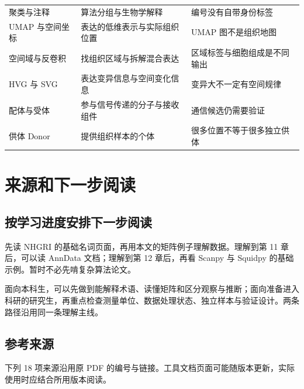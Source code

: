 \documentclass[UTF8,a4paper,11pt,fontset=fandol]{ctexart}
\newcommand{\chapterstart}[1]{\clearpage\section{#1}}
\begin{document}
{\begin{longtable}{@{}p{3.35cm} p{5.05cm} p{\dimexpr\linewidth-8.4cm-4\tabcolsep\relax}@{}}
聚类与注释 & 算法分组与生物学解释 & 编号没有自带身份标签 \\
UMAP 与空间坐标 & 表达的低维表示与实际组织位置 & UMAP 图不是组织地图 \\
空间域与反卷积 & 找组织区域与拆解混合表达 & 区域标签与细胞组成是不同输出 \\
HVG 与 SVG & 表达变异信息与空间变化信息 & 变异大不一定有空间规律 \\
配体与受体 & 参与信号传递的分子与接收组件 & 通信候选仍需要验证 \\
供体 Donor & 提供组织样本的个体 & 很多位置不等于很多独立供体 \\
\end{longtable}
}

\chapterstart{来源和下一步阅读}
\subsection{按学习进度安排下一步阅读}
先读 NHGRI 的基础名词页面，再用本文的矩阵例子理解数据。理解到第 11 章后，可以读 AnnData 文档；理解到第 12 章后，再看 Scanpy 与 Squidpy 的基础示例。暂时不必先啃复杂算法论文。

面向本科生，可以先做到能解释术语、读懂矩阵和区分观察与推断；面向准备进入科研的研究生，再重点检查测量单位、数据处理状态、独立样本与验证设计。两条路径沿用同一条理解主线。

\subsection{参考来源}
下列 18 项来源沿用原 PDF 的编号与链接。工具文档页面可能随版本更新，实际使用时应结合所用版本阅读。
\end{document}
